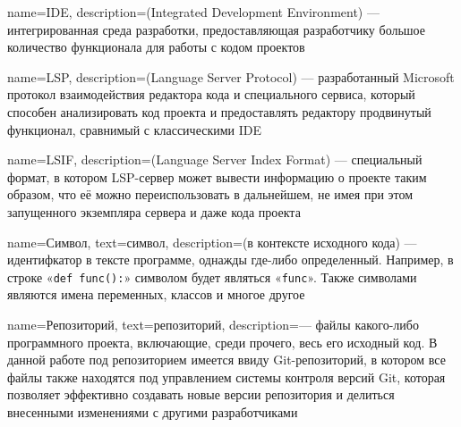 \usepackage[nonumberlist,nogroupskip,xindy={glsnumbers=false,codepage=utf8,language=russian}]{glossaries}
\usepackage[automake=immediate]{glossaries-extra}
\renewcommand{\glossarysection}[2][]{}
\renewcommand{\glsnamefont}[1]{\textrm{#1}}
\makeglossaries

{
    name=IDE,
    description={(Integrated Development Environment) — интегрированная среда разработки, предоставляющая разработчику большое количество функционала для работы с кодом проектов}
}

{
    name=LSP,
    description={(Language Server Protocol) \cite{lsp-book} — разработанный Microsoft протокол взаимодействия редактора кода и специального сервиса, который способен анализировать код проекта и предоставлять редактору продвинутый функционал, сравнимый с классическими IDE}
}

{
    name=LSIF,
    description={(Language Server Index Format) \cite{lsif} — специальный формат, в котором LSP-сервер может вывести информацию о проекте таким образом, что её можно переиспользовать в дальнейшем, не имея при этом запущенного экземпляра сервера и даже кода проекта}
}

{
    name={Символ},
    text={символ},
    description={(в контексте исходного кода) — идентифкатор в тексте программе, однажды где-либо определенный. Например, в строке «\texttt{def func():}» символом будет являться «\texttt{func}». Также символами являются имена переменных, классов и многое другое}
}

{
    name={Репозиторий},
    text={репозиторий},
    description={— файлы какого-либо программного проекта, включающие, среди прочего, весь его исходный код. В данной работе под репозиторием имеется ввиду Git-репозиторий, в котором все файлы также находятся под управлением системы контроля версий Git, которая позволяет эффективно создавать новые версии репозитория и делиться внесенными изменениями с другими разработчиками}
}